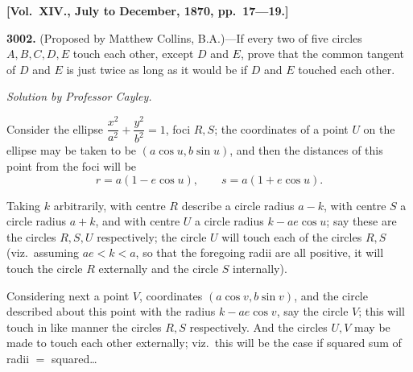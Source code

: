 \documentclass[11pt]{article}
\begin{document}
\medskip
\begin{center}\textbf{[Vol.\ XIV., July to December, 1870, pp.\ 17---19.]}\end{center}

\medskip
\textbf{3002.} (Proposed by Matthew Collins, B.A.)---If every two of five circles $A, B, C, D, E$ touch each other, except $D$ and $E$, prove that the common tangent of $D$ and $E$ is just twice as long as it would be if $D$ and $E$ touched each other.

\medskip
\begin{center}\textit{Solution by Professor Cayley.}\end{center}

\medskip
Consider the ellipse $\dfrac{x^2}{a^2} + \dfrac{y^2}{b^2} = 1$, foci $R, S$; the coordinates of a point $U$ on the ellipse may be taken to be $(a\cos u, b\sin u)$, and then the distances of this point from the foci will be
\[
r = a(1 - e\cos u),\qquad s = a(1 + e\cos u).
\]

Taking $k$ arbitrarily, with centre $R$ describe a circle radius $a - k$, with centre $S$ a circle radius $a + k$, and with centre $U$ a circle radius $k - ae\cos u$; say these are the circles $R, S, U$ respectively; the circle $U$ will touch each of the circles $R, S$ (viz.\ assuming $ae < k < a$, so that the foregoing radii are all positive, it will touch the circle $R$ externally and the circle $S$ internally).

Considering next a point $V$, coordinates $(a\cos v, b\sin v)$, and the circle described about this point with the radius $k - ae\cos v$, say the circle $V$; this will touch in like manner the circles $R, S$ respectively. And the circles $U, V$ may be made to touch each other externally; viz.\ this will be the case if squared sum of radii $=$ squared\ldots
\end{document}
